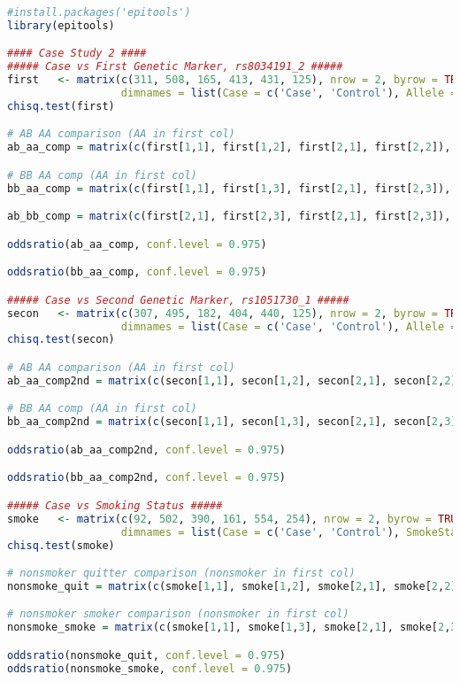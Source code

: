 \documentclass{article}
\begin{document}
\begin{lstlisting}[language=R, caption={R code for analyzing case study 2 with genetic markers and smoking status}, label={lst:rcode_case_study_2}]
#install.packages('epitools')
library(epitools)

#### Case Study 2 ####
##### Case vs First Genetic Marker, rs8034191_2 #####
first   <- matrix(c(311, 508, 165, 413, 431, 125), nrow = 2, byrow = TRUE, 
                  dimnames = list(Case = c('Case', 'Control'), Allele = c('AA', 'AB', 'BB')))
chisq.test(first)

# AB AA comparison (AA in first col)
ab_aa_comp = matrix(c(first[1,1], first[1,2], first[2,1], first[2,2]), nrow = 2)

# BB AA comp (AA in first col)
bb_aa_comp = matrix(c(first[1,1], first[1,3], first[2,1], first[2,3]), nrow = 2)

ab_bb_comp = matrix(c(first[2,1], first[2,3], first[2,1], first[2,3]), nrow = 2)

oddsratio(ab_aa_comp, conf.level = 0.975)

oddsratio(bb_aa_comp, conf.level = 0.975)

##### Case vs Second Genetic Marker, rs1051730_1 #####
secon   <- matrix(c(307, 495, 182, 404, 440, 125), nrow = 2, byrow = TRUE, 
                  dimnames = list(Case = c('Case', 'Control'), Allele = c('AA', 'AB', 'BB')))
chisq.test(secon)

# AB AA comparison (AA in first col)
ab_aa_comp2nd = matrix(c(secon[1,1], secon[1,2], secon[2,1], secon[2,2]), nrow = 2)

# BB AA comp (AA in first col)
bb_aa_comp2nd = matrix(c(secon[1,1], secon[1,3], secon[2,1], secon[2,3]), nrow = 2)

oddsratio(ab_aa_comp2nd, conf.level = 0.975)

oddsratio(bb_aa_comp2nd, conf.level = 0.975)

##### Case vs Smoking Status #####
smoke   <- matrix(c(92, 502, 390, 161, 554, 254), nrow = 2, byrow = TRUE, 
                  dimnames = list(Case = c('Case', 'Control'), SmokeStatus = c('Never', 'Former', 'Current')))
chisq.test(smoke)

# nonsmoker quitter comparison (nonsmoker in first col)
nonsmoke_quit = matrix(c(smoke[1,1], smoke[1,2], smoke[2,1], smoke[2,2]), nrow = 2)

# nonsmoker smoker comparison (nonsmoker in first col)
nonsmoke_smoke = matrix(c(smoke[1,1], smoke[1,3], smoke[2,1], smoke[2,3]), nrow = 2)

oddsratio(nonsmoke_quit, conf.level = 0.975)
oddsratio(nonsmoke_smoke, conf.level = 0.975)
\end{lstlisting}




		
\end{document}
